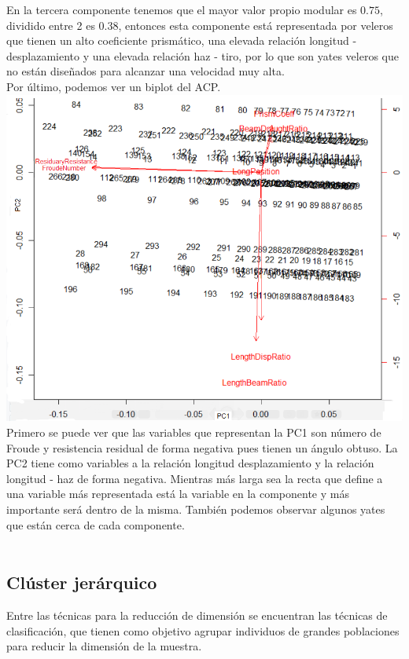 \documentclass[twoside]{article}
\begin{document}
\begin{multicols}{2}
En la tercera componente tenemos que el mayor valor propio modular es $0.75$, dividido entre 2 es $0.38$, entonces esta componente est\'a representada por veleros que tienen un alto coeficiente prism\'atico, una elevada relaci\'on longitud - desplazamiento y una elevada relaci\'on haz - tiro, por lo que son yates veleros que no est\'an dise\~nados para alcanzar una velocidad muy alta.\\

Por \'ultimo, podemos ver un biplot del ACP.\\

\includegraphics[scale = 0.3]{images/pic_26.png} \\

Primero se puede ver que las variables que representan la PC1 son n\'umero de Froude y resistencia residual de forma negativa pues tienen un \'angulo obtuso. La PC2 tiene como variables a la relaci\'on longitud desplazamiento y la relaci\'on longitud - haz de forma negativa. Mientras m\'as larga sea la recta que define a una variable m\'as representada est\'a la variable en la componente y m\'as importante ser\'a dentro de la misma. Tambi\'en podemos observar algunos yates que est\'an cerca de cada componente.\\\\


\subsection{Cl\'uster jer\'arquico}
Entre las t\'ecnicas para la reducci\'on de dimensi\'on se encuentran las t\'ecnicas de clasificaci\'on, que tienen como objetivo agrupar individuos de grandes poblaciones para reducir la dimensi\'on de la muestra. 


\end{multicols}
\end{document}
